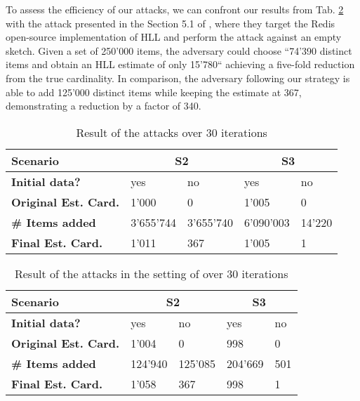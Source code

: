 \documentclass{IEEEtran}
\begin{document}
To assess the efficiency of our attacks, we can confront our results from Tab. \ref{table:tab2} with the attack presented in the Section 5.1 of \cite{hllvuln}, where they target the Redis \cite{redishll} open-source implementation of HLL and perform the attack against an empty sketch. Given a set of 250'000 items, the adversary could choose ``74'390 distinct items and obtain an HLL estimate of only 15'780`` achieving a five-fold reduction from the true cardinality. In comparison, the adversary following our strategy is able to add 125'000 distinct items while keeping the estimate at 367, demonstrating a reduction by a factor of 340. 

\begin{table}[h]
\caption{Result of the attacks over 30 iterations}
\begin{tabular}{| m{8.5em} | m{4em} | m{4em} | m{4em} | m{4em} |}
    \hline
    \textbf{Scenario} & \multicolumn{2}{c|}{S2} & \multicolumn{2}{c|}{S3} \\ \hline
    \textbf{Initial data?} & yes & no & yes & no \\ \hline
    \textbf{Original Est. Card.} & 1'000 & 0 & 1'005 & 0 \\ \hline
    \textbf{\# Items added} & 3'655'744 & 3'655'740 & 6'090'003 & 14'220 \\ \hline
    \textbf{Final Est. Card.} & 1'011 & 367 & 1'005 & 1 \\ \hline
\end{tabular}
\label{table:tab1}
\end{table}

\begin{table}[h]
\caption{Result of the attacks in the setting of \cite{hllvuln} over 30 iterations}
\begin{tabular}{| m{8.5em} | m{4em} | m{4em} | m{4em} | m{4em} |}
    \hline
    \textbf{Scenario} & \multicolumn{2}{c|}{S2} & \multicolumn{2}{c|}{S3} \\ \hline
    \textbf{Initial data?} & yes & no & yes & no \\ \hline
    \textbf{Original Est. Card.} & 1'004 & 0 & 998 & 0 \\ \hline
    \textbf{\# Items added} & 124'940 & 125'085 & 204'669 & 501 \\ \hline
    \textbf{Final Est. Card.} & 1'058 & 367 & 998 & 1 \\ \hline
\end{tabular}
\label{table:tab2}
\end{table}
\end{document}
